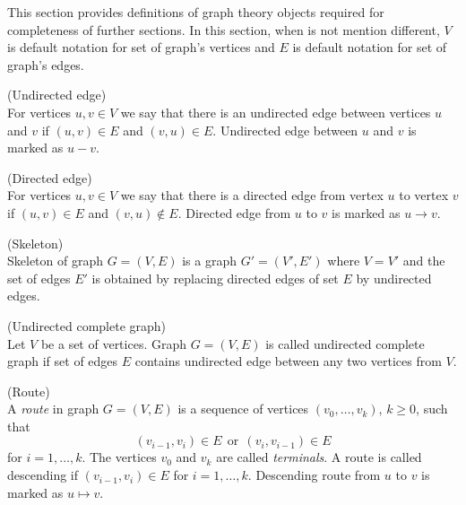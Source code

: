 %
%


This section provides definitions of graph theory objects required for completeness of further sections.
In this section, when is not mention different, $V$ is default notation for set of graph's vertices and 
$E$ is default notation for set of graph's edges. 


\begin{defi} (Undirected edge) \\
	For vertices $u, v \in V$ we say that there is an undirected edge between vertices $u$ 
	and $v$ if $(u, v) \in E$ and $(v, u) \in E$. Undirected edge between $u$ and $v$ is marked as $u-v$.
\end{defi}


\begin{defi} (Directed edge) \\
	For vertices $u, v \in V$ we say that there is a directed edge from vertex $u$ to vertex $v$ if
	$(u, v) \in E$ and $(v, u) \notin E$. Directed edge from $u$ to $v$ is marked as $u \rightarrow v$.
\end{defi}


\begin{defi} (Skeleton) \\
	Skeleton of graph $G = (V, E)$ is a graph $G' = (V', E')$ where $V = V'$ and the set of edges $E'$
	is obtained by replacing directed edges of set $E$ by undirected edges.
\end{defi}


\begin{defi} (Undirected complete graph) \\ 
	Let $V$ be a set of vertices. Graph $G = (V, E)$ is called undirected complete graph if set of edges $E$ 
	contains undirected edge between any two vertices from $V$.
\end{defi}

\begin{defi} (Route) \\
	A \textit{route} in graph $G = (V, E)$ is a sequence of vertices $(v_0, \dots, v_k)$, $k \ge 0$, such that 
	$$ (v_{i-1}, v_i) \in E \ \  \mbox{or} \ \ (v_i, v_{i-1}) \in E$$
	for $i = 1, \dots, k$. The vertices $v_0$ and $v_k$ are called \textit{terminals}. A route is called descending
	if $(v_{i-1}, v_i) \in E$ for $i = 1, \dots, k$. Descending route from $u$ to $v$ is marked as $u \mapsto v$. 
\end{defi}


